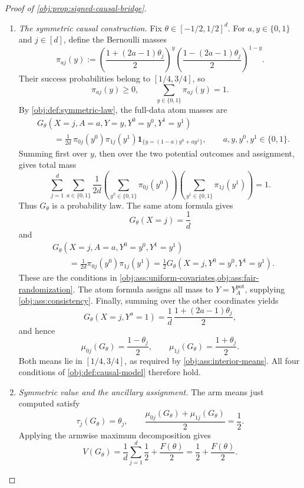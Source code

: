 \begin{proof}[Proof of \cref{obj:prop:signed-causal-bridge}]
\begin{enumerate}
\item \emph{The symmetric causal construction.}
Fix \(\theta\in[-1/2,1/2]^d\). For
\(a,y\in\{0,1\}\) and \(j\in[d]\), define the Bernoulli masses
\[
\pi_{aj}(y)
:=
\left(\frac{1+(2a-1)\theta_j}{2}\right)^y
\left(\frac{1-(2a-1)\theta_j}{2}\right)^{1-y}.
\]
Their success probabilities belong to \([1/4,3/4]\), so
\[
\pi_{aj}(y)\ge0,
\qquad
\sum_{y\in\{0,1\}}\pi_{aj}(y)=1.
\]
By \cref{obj:def:symmetric-law}, the full-data atom masses are
\[
\begin{aligned}
&G_\theta(X=j,A=a,Y=y,Y^0=y^0,Y^1=y^1)\\
&\qquad=\frac1{2d}\,
\pi_{0j}(y^0)\pi_{1j}(y^1)
\mathbf1_{\{y=(1-a)y^0+ay^1\}},
\qquad a,y,y^0,y^1\in\{0,1\}.
\end{aligned}
\]
Summing first over \(y\), then over the two potential outcomes and
assignment, gives total mass
\[
\sum_{j=1}^d\sum_{a\in\{0,1\}}\frac1{2d}
\left(\sum_{y^0\in\{0,1\}}\pi_{0j}(y^0)\right)
\left(\sum_{y^1\in\{0,1\}}\pi_{1j}(y^1)\right)
=1.
\]
Thus \(G_\theta\) is a probability law. The same atom formula gives
\[
G_\theta(X=j)=\frac1d
\]
and
\[
\begin{aligned}
&G_\theta(X=j,A=a,Y^0=y^0,Y^1=y^1)\\
&\qquad=\frac1{2d}\pi_{0j}(y^0)\pi_{1j}(y^1)
=\frac12G_\theta(X=j,Y^0=y^0,Y^1=y^1).
\end{aligned}
\]
These are the conditions in
\cref{obj:ass:uniform-covariates,obj:ass:fair-randomization}.
The atom formula assigns all mass to \(Y=Y_A^{\mathrm{pot}}\), supplying
\cref{obj:ass:consistency}. Finally, summing over the other coordinates yields
\[
G_\theta(X=j,Y^a=1)
=\frac1d\,\frac{1+(2a-1)\theta_j}{2},
\]
and hence
\[
\mu_{0j}(G_\theta)=\frac{1-\theta_j}{2},
\qquad
\mu_{1j}(G_\theta)=\frac{1+\theta_j}{2}.
\]
Both means lie in \([1/4,3/4]\), as required by
\cref{obj:ass:interior-means}. All four conditions of
\cref{obj:def:causal-model} therefore hold.

\item \emph{Symmetric value and the ancillary assignment.}
The arm means just computed satisfy
\[
\tau_j(G_\theta)=\theta_j,
\qquad
\frac{\mu_{0j}(G_\theta)+\mu_{1j}(G_\theta)}2=\frac12.
\]
Applying the armwise maximum decomposition gives
\[
V(G_\theta)
=\frac1d\sum_{j=1}^d\frac12+\frac{F(\theta)}2
=\frac12+\frac{F(\theta)}2.
\]


\end{enumerate}
\end{proof}
